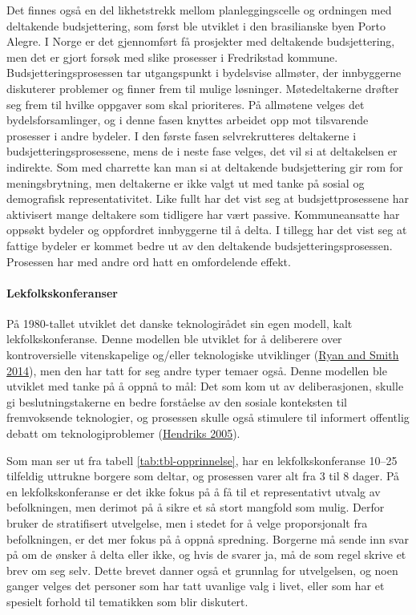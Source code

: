 \documentclass[
  12pt,
  a4paper, 12pt]{article}
\begin{document}
Det finnes også en del likhetstrekk mellom planleggingscelle og ordningen med deltakende budsjettering, som først ble utviklet i den brasilianske byen Porto Alegre. I Norge er det gjennomført få prosjekter med deltakende budsjettering, men det er gjort forsøk med slike prosesser i Fredrikstad kommune. Budsjetteringsprosessen tar utgangspunkt i bydelsvise allmøter, der innbyggerne diskuterer problemer og finner frem til mulige løsninger. Møtedeltakerne drøfter seg frem til hvilke oppgaver som skal prioriteres. På allmøtene velges det bydelsforsamlinger, og i denne fasen knyttes arbeidet opp mot tilsvarende prosesser i andre bydeler. I den første fasen selvrekrutteres deltakerne i budsjetteringsprosessene, mens de i neste fase velges, det vil si at deltakelsen er indirekte. Som med charrette kan man si at deltakende budsjettering gir rom for meningsbrytning, men deltakerne er ikke valgt ut med tanke på sosial og demografisk representativitet. Like fullt har det vist seg at budsjettprosessene har aktivisert mange deltakere som tidligere har vært passive. Kommuneansatte har oppsøkt bydeler og oppfordret innbyggerne til å delta. I tillegg har det vist seg at fattige bydeler er kommet bedre ut av den deltakende budsjetteringsprosessen. Prosessen har med andre ord hatt en omfordelende effekt.

\hypertarget{lekfolkskonferanser}{%
\paragraph{Lekfolkskonferanser}\label{lekfolkskonferanser}}

På 1980-tallet utviklet det danske teknologirådet sin egen modell, kalt lekfolkskonferanse. Denne modellen ble utviklet for å deliberere over kontroversielle vitenskapelige og/eller teknologiske utviklinger (\protect\hyperlink{ref-ryan_defining_2014}{Ryan and Smith 2014}), men den har tatt for seg andre typer temaer også. Denne modellen ble utviklet med tanke på å oppnå to mål: Det som kom ut av deliberasjonen, skulle gi beslutningstakerne en bedre forståelse av den sosiale konteksten til fremvoksende teknologier, og prosessen skulle også stimulere til informert offentlig debatt om teknologiproblemer (\protect\hyperlink{ref-1885-53297}{Hendriks 2005}).

Som man ser ut fra tabell \ref{tab:tbl-opprinnelse}, har en lekfolkskonferanse 10--25 tilfeldig uttrukne borgere som deltar, og prosessen varer alt fra 3 til 8 dager. På en lekfolkskonferanse er det ikke fokus på å få til et representativt utvalg av befolkningen, men derimot på å sikre et så stort mangfold som mulig. Derfor bruker de stratifisert utvelgelse, men i stedet for å velge proporsjonalt fra befolkningen, er det mer fokus på å oppnå spredning. Borgerne må sende inn svar på om de ønsker å delta eller ikke, og hvis de svarer ja, må de som regel skrive et brev om seg selv. Dette brevet danner også et grunnlag for utvelgelsen, og noen ganger velges det personer som har tatt uvanlige valg i livet, eller som har et spesielt forhold til tematikken som blir diskutert.
\end{document}

